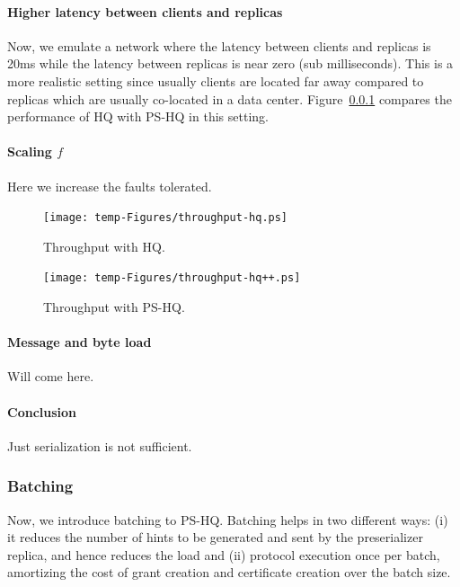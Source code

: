 \documentclass[twocolumn,10pt]{article}
\begin{document}
\paragraph{Higher latency between clients and replicas} Now, we emulate a network where the latency
between clients and replicas is 20ms while the latency between replicas is near zero (sub milliseconds).
This is a more realistic setting since usually clients are located far away compared to replicas which
are usually co-located in a data center. Figure~\ref{} compares the performance of HQ with PS-HQ in
this setting.

\paragraph{Scaling $f$} Here we increase the faults tolerated.

\begin{figure}
\centering
\texttt{[image: temp-Figures/throughput-hq.ps]}
\caption{Throughput with HQ.}
\label{fig:throughtput-hq}
\end{figure}

\begin{figure}
\centering
\texttt{[image: temp-Figures/throughput-hq++.ps]}
\caption{Throughput with PS-HQ.}
\label{fig:throughtput-pshq}
\end{figure}





\paragraph{Message and byte load}
Will come here.

\paragraph{Conclusion} Just serialization is not sufficient. 

\subsubsection{Batching}

Now, we introduce batching to PS-HQ. Batching helps in two different ways: (i) it reduces
the number of hints to be generated and sent by the preserializer replica, and hence reduces
 the load and (ii) protocol execution once per batch, amortizing the cost of grant creation and
certificate creation over the batch size.
\end{document}
